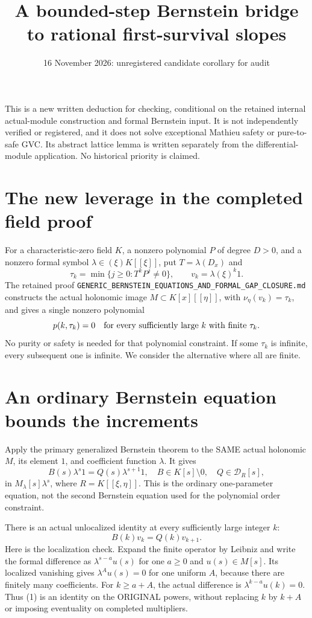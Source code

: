 \documentclass{article}
\begin{document}
\title{A bounded-step Bernstein bridge to rational first-survival slopes}
\date{16 November 2026: unregistered candidate corollary for audit}
\maketitle
This is a new written deduction for checking, conditional on the retained internal actual-module construction and formal Bernstein input. It is not independently verified or registered, and it does not solve exceptional Mathieu safety or pure-to-safe GVC. Its abstract lattice lemma is written separately from the differential-module application. No historical priority is claimed.

\section{The new leverage in the completed field proof}
For a characteristic-zero field $K$, a nonzero polynomial $P$ of degree $D>0$, and a nonzero formal symbol $\lambda\in(\xi)K[[\xi]]$, put $T=\lambda(D_x)$ and
\[
 \tau_k=\min\{j\ge0:T^kP^j\ne0\},\qquad
 v_k=\lambda(\xi)^k1.
\]
The retained proof \texttt{GENERIC\_BERNSTEIN\_EQUATIONS\_AND\_FORMAL\_GAP\_CLOSURE.md} constructs the actual holonomic image $M\subset K[x][[\eta]]$, with $\nu_\eta(v_k)=\tau_k$, and gives a single nonzero polynomial
\[
 p(k,\tau_k)=0\quad\hbox{for every sufficiently large $k$ with finite $\tau_k$}.
\]
No purity or safety is needed for that polynomial constraint. If some $\tau_k$ is infinite, every subsequent one is infinite. We consider the alternative where all are finite.

\section{An ordinary Bernstein equation bounds the increments}
Apply the primary generalized Bernstein theorem to the SAME actual holonomic $M$, its element $1$, and coefficient function $\lambda$. It gives
\[
 B(s)\lambda^s1=Q(s)\lambda^{s+1}1,
 \quad B\in K[s]\setminus0,\quad Q\in\mathcal D_R[s],
\]
in $M_\lambda[s]\lambda^s$, where $R=K[[\xi,\eta]]$. This is the ordinary one-parameter equation, not the second Bernstein equation used for the polynomial order constraint.

There is an actual unlocalized identity at every sufficiently large integer $k$:
\[
 B(k)v_k=Q(k)v_{k+1}.                                      \tag{1}
\]
Here is the localization check. Expand the finite operator by Leibniz and write the formal difference as $\lambda^{s-a}u(s)$ for one $a\ge0$ and $u(s)\in M[s]$. Its localized vanishing gives $\lambda^A u(s)=0$ for one uniform $A$, because there are finitely many coefficients. For $k\ge a+A$, the actual difference is $\lambda^{k-a}u(k)=0$. Thus (1) is an identity on the ORIGINAL powers, without replacing $k$ by $k+A$ or imposing eventuality on completed multipliers.
\end{document}
